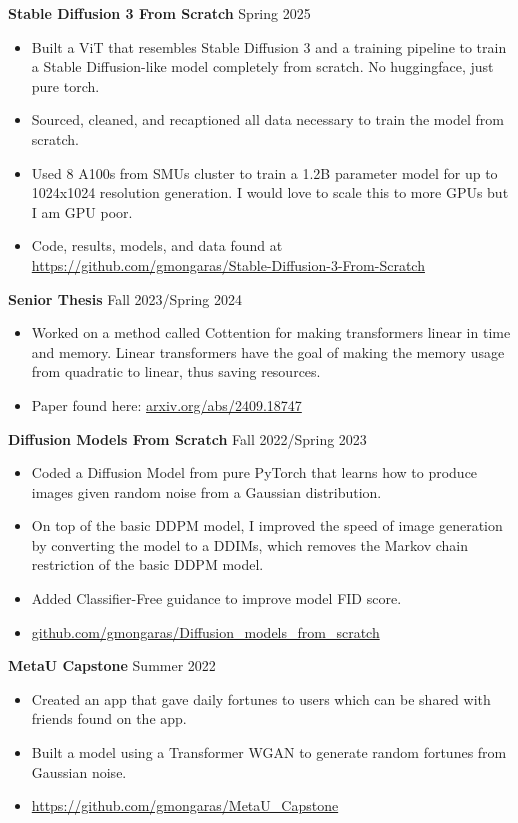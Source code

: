 \documentclass[a4paper,10pt]{article}
\begin{document}
\noindent\textbf{Stable Diffusion 3 From Scratch} \hfill Spring  2025
\begin{itemize}[noitemsep,topsep=0pt]
  \item Built a ViT that resembles Stable Diffusion 3 and a training pipeline to train a Stable Diffusion-like model completely from scratch. No huggingface, just pure torch.
  \item Sourced, cleaned, and recaptioned all data necessary to train the model from scratch.
  \item Used 8 A100s from SMUs cluster to train a 1.2B parameter model for up to 1024x1024 resolution generation. I would love to scale this to more GPUs but I am GPU poor.
  \item Code, results, models, and data found at \href{https://github.com/gmongaras/Stable-Diffusion-3-From-Scratch}{https://github.com/gmongaras/Stable-Diffusion-3-From-Scratch}
\end{itemize}

\noindent\textbf{Senior Thesis} \hfill Fall 2023/Spring 2024
\begin{itemize}[noitemsep,topsep=0pt]
  \item Worked on a method called Cottention for making transformers linear in time and memory. Linear transformers have the goal of making the memory usage from quadratic to linear, thus saving resources.
  \item Paper found here: \href{https://arxiv.org/abs/2409.18747}{arxiv.org/abs/2409.18747}
\end{itemize}

\noindent\textbf{Diffusion Models From Scratch} \hfill Fall 2022/Spring 2023
\begin{itemize}[noitemsep,topsep=0pt]
  \item Coded a Diffusion Model from pure PyTorch that learns how to produce images given random noise from a Gaussian distribution.
  \item On top of the basic DDPM model, I improved the speed of image generation by converting the model to a DDIMs, which removes the Markov chain restriction of the basic DDPM model.
  \item Added Classifier-Free guidance to improve model FID score.
  \item \href{https://github.com/gmongaras/Diffusion_models_from_scratch}{github.com/gmongaras/Diffusion\_models\_from\_scratch}
\end{itemize}

\noindent\textbf{MetaU Capstone} \hfill Summer 2022
\begin{itemize}[noitemsep,topsep=0pt]
  \item Created an app that gave daily fortunes to users which can be shared with friends found on the app.
  \item Built a model using a Transformer WGAN to generate random fortunes from Gaussian noise.
  \item \href{https://github.com/gmongaras/MetaU_Capstone}{https://github.com/gmongaras/MetaU\_Capstone}
\end{itemize}
\end{document}

